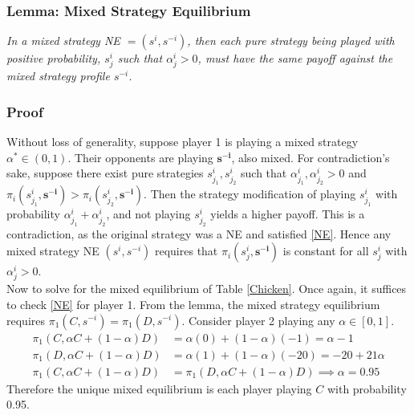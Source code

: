 \subsubsection{Lemma: Mixed Strategy Equilibrium}
\emph{In a mixed strategy NE $ = (s^i,s^{-i})$, then each pure strategy being played with positive probability, $s_j^i$ such that $\alpha_j^i>0$, must have the same payoff against the mixed strategy profile $s^{-i}$.  }
\subsubsection{Proof}
 Without loss of generality, suppose player 1 is playing a mixed strategy $\alpha^* \in (0,1)$. Their opponents are playing $\mathbf{s^{-i}}$, also mixed. For contradiction's sake, suppose there exist pure strategies $s_{j_1}^i, s_{j_2}^i$ such that $\alpha_{j_1}^i, \alpha_{j_2}^i >0$ and $\pi_i(s_{j_1}^i,\mathbf{s^{-i}}) > \pi_i(s_{j_2}^i,\mathbf{s^{-i}})$. Then the strategy modification of playing $s_{j_1}^i$ with probability $\alpha_{j_1}^i + \alpha_{j_2}^i$, and not playing $s_{j_2}^i$ yields a higher payoff. This is a contradiction, as the original strategy was a NE and satisfied \eqref{NE}. Hence any mixed strategy NE $(s^i,s^{-i})$ requires that $\pi_i(s_j^i, \mathbf{s^{-i}})$ is constant for all $s_j^i$ with $\alpha_j^i>0$. \halmos \\

Now to solve for the mixed equilibrium of Table \ref{Chicken}. Once again, it suffices to check \eqref{NE} for player 1. From the lemma, the mixed strategy equilibrium requires $\pi_1(C,s^{-i}) = \pi_1(D,s^{-i})$. 
Consider player 2 playing any $\alpha \in [0,1]$. 
\begin{align*}
    \pi_1(C,\alpha C + (1-\alpha)D) &= \alpha (0) + (1-\alpha)(-1) = \alpha -1 \\
    \pi_1(D,\alpha C + (1-\alpha)D) &= \alpha (1) + (1-\alpha)(-20) = -20 + 21\alpha\\
    \pi_1(C,\alpha C + (1-\alpha)D) &= \pi_1(D,\alpha C
    + (1-\alpha)D) \implies \alpha = 0.95
\end{align*}
Therefore the unique mixed equilibrium is each player playing $C$ with probability 0.95. \\



